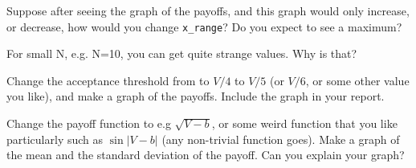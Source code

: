 \begin{exercise}
Suppose after seeing the graph of the payoffs, and this graph would only increase, or decrease, how would you change \verb|x_range|? Do you expect to see a maximum?
\end{exercise}




\begin{exercise}
For small N, e.g. N=10, you can get quite strange values. Why is that?
\end{exercise}


\begin{exercise}
Change the acceptance threshold from to $V/4$ to $V/5$ (or $V/6$, or some other value you like), and make a graph of the payoffs.
Include the graph in your report.
\end{exercise}

\begin{exercise}
Change the payoff function to e.g $\sqrt{V-b}$, or some weird function that you like particularly such as $\sin |V-b|$ (any non-trivial function goes).
Make a graph of the  mean and the standard deviation of the payoff. Can you explain your graph?
\end{exercise}
